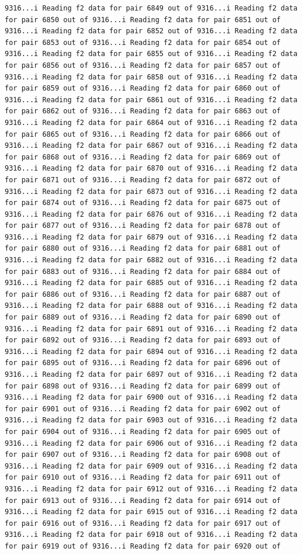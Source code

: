 \documentclass[
]{article}
\begin{document}
\begin{verbatim}
9316...i Reading f2 data for pair 6849 out of 9316...i Reading f2 data for pair 6850 out of 9316...i Reading f2 data for pair 6851 out of 9316...i Reading f2 data for pair 6852 out of 9316...i Reading f2 data for pair 6853 out of 9316...i Reading f2 data for pair 6854 out of 9316...i Reading f2 data for pair 6855 out of 9316...i Reading f2 data for pair 6856 out of 9316...i Reading f2 data for pair 6857 out of 9316...i Reading f2 data for pair 6858 out of 9316...i Reading f2 data for pair 6859 out of 9316...i Reading f2 data for pair 6860 out of 9316...i Reading f2 data for pair 6861 out of 9316...i Reading f2 data for pair 6862 out of 9316...i Reading f2 data for pair 6863 out of 9316...i Reading f2 data for pair 6864 out of 9316...i Reading f2 data for pair 6865 out of 9316...i Reading f2 data for pair 6866 out of 9316...i Reading f2 data for pair 6867 out of 9316...i Reading f2 data for pair 6868 out of 9316...i Reading f2 data for pair 6869 out of 9316...i Reading f2 data for pair 6870 out of 9316...i Reading f2 data for pair 6871 out of 9316...i Reading f2 data for pair 6872 out of 9316...i Reading f2 data for pair 6873 out of 9316...i Reading f2 data for pair 6874 out of 9316...i Reading f2 data for pair 6875 out of 9316...i Reading f2 data for pair 6876 out of 9316...i Reading f2 data for pair 6877 out of 9316...i Reading f2 data for pair 6878 out of 9316...i Reading f2 data for pair 6879 out of 9316...i Reading f2 data for pair 6880 out of 9316...i Reading f2 data for pair 6881 out of 9316...i Reading f2 data for pair 6882 out of 9316...i Reading f2 data for pair 6883 out of 9316...i Reading f2 data for pair 6884 out of 9316...i Reading f2 data for pair 6885 out of 9316...i Reading f2 data for pair 6886 out of 9316...i Reading f2 data for pair 6887 out of 9316...i Reading f2 data for pair 6888 out of 9316...i Reading f2 data for pair 6889 out of 9316...i Reading f2 data for pair 6890 out of 9316...i Reading f2 data for pair 6891 out of 9316...i Reading f2 data for pair 6892 out of 9316...i Reading f2 data for pair 6893 out of 9316...i Reading f2 data for pair 6894 out of 9316...i Reading f2 data for pair 6895 out of 9316...i Reading f2 data for pair 6896 out of 9316...i Reading f2 data for pair 6897 out of 9316...i Reading f2 data for pair 6898 out of 9316...i Reading f2 data for pair 6899 out of 9316...i Reading f2 data for pair 6900 out of 9316...i Reading f2 data for pair 6901 out of 9316...i Reading f2 data for pair 6902 out of 9316...i Reading f2 data for pair 6903 out of 9316...i Reading f2 data for pair 6904 out of 9316...i Reading f2 data for pair 6905 out of 9316...i Reading f2 data for pair 6906 out of 9316...i Reading f2 data for pair 6907 out of 9316...i Reading f2 data for pair 6908 out of 9316...i Reading f2 data for pair 6909 out of 9316...i Reading f2 data for pair 6910 out of 9316...i Reading f2 data for pair 6911 out of 9316...i Reading f2 data for pair 6912 out of 9316...i Reading f2 data for pair 6913 out of 9316...i Reading f2 data for pair 6914 out of 9316...i Reading f2 data for pair 6915 out of 9316...i Reading f2 data for pair 6916 out of 9316...i Reading f2 data for pair 6917 out of 9316...i Reading f2 data for pair 6918 out of 9316...i Reading f2 data for pair 6919 out of 9316...i Reading f2 data for pair 6920 out of 
\end{verbatim}
\end{document}
